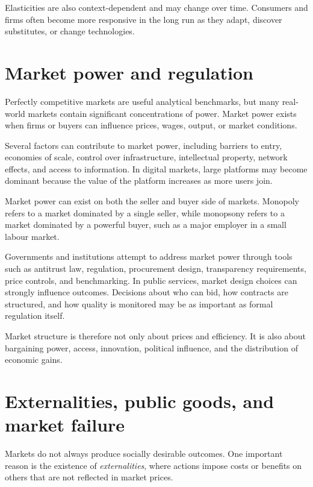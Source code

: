 \documentclass[
  11pt,
  oneside]{book}
\begin{document}
Elasticities are also context-dependent and may change over time. Consumers and firms often become more responsive in the long run as they adapt, discover substitutes, or change technologies.

\section{Market power and regulation}\label{market-power-and-regulation}

Perfectly competitive markets are useful analytical benchmarks, but many real-world markets contain significant concentrations of power. Market power exists when firms or buyers can influence prices, wages, output, or market conditions.

Several factors can contribute to market power, including barriers to entry, economies of scale, control over infrastructure, intellectual property, network effects, and access to information. In digital markets, large platforms may become dominant because the value of the platform increases as more users join.

Market power can exist on both the seller and buyer side of markets. Monopoly refers to a market dominated by a single seller, while monopsony refers to a market dominated by a powerful buyer, such as a major employer in a small labour market.

Governments and institutions attempt to address market power through tools such as antitrust law, regulation, procurement design, transparency requirements, price controls, and benchmarking. In public services, market design choices can strongly influence outcomes. Decisions about who can bid, how contracts are structured, and how quality is monitored may be as important as formal regulation itself.

Market structure is therefore not only about prices and efficiency. It is also about bargaining power, access, innovation, political influence, and the distribution of economic gains.

\section{Externalities, public goods, and market failure}\label{externalities-public-goods-and-market-failure}

Markets do not always produce socially desirable outcomes. One important reason is the existence of \emph{externalities}, where actions impose costs or benefits on others that are not reflected in market prices.
\end{document}
